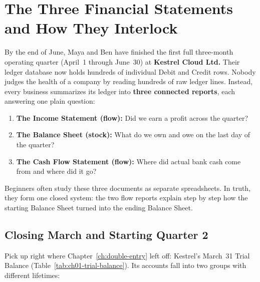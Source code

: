 \chapter{The Three Financial Statements and How They Interlock}
\label{ch:three-statements}
\chapterline

By the end of June, Maya and Ben have finished the first full three-month operating quarter (April~1 through June~30) at \textbf{Kestrel Cloud Ltd.} Their ledger database now holds hundreds of individual Debit and Credit rows. Nobody judges the health of a company by reading hundreds of raw ledger lines. Instead, every business summarizes its ledger into \textbf{three connected reports}, each answering one plain question:

\begin{enumerate}
  \item \textbf{The Income Statement (flow):} Did we earn a profit across the quarter?
  \item \textbf{The Balance Sheet (stock):} What do we own and owe on the last day of the quarter?
  \item \textbf{The Cash Flow Statement (flow):} Where did actual bank cash come from and where did it go?
\end{enumerate}

Beginners often study these three documents as separate spreadsheets. In truth, they form one closed system: the two flow reports explain step by step how the starting Balance Sheet turned into the ending Balance Sheet.

\section{Closing March and Starting Quarter 2}

Pick up right where Chapter~\ref{ch:double-entry} left off: Kestrel's March~31 Trial Balance (Table~\ref{tab:ch01-trial-balance}). Its accounts fall into two groups with different lifetimes:

